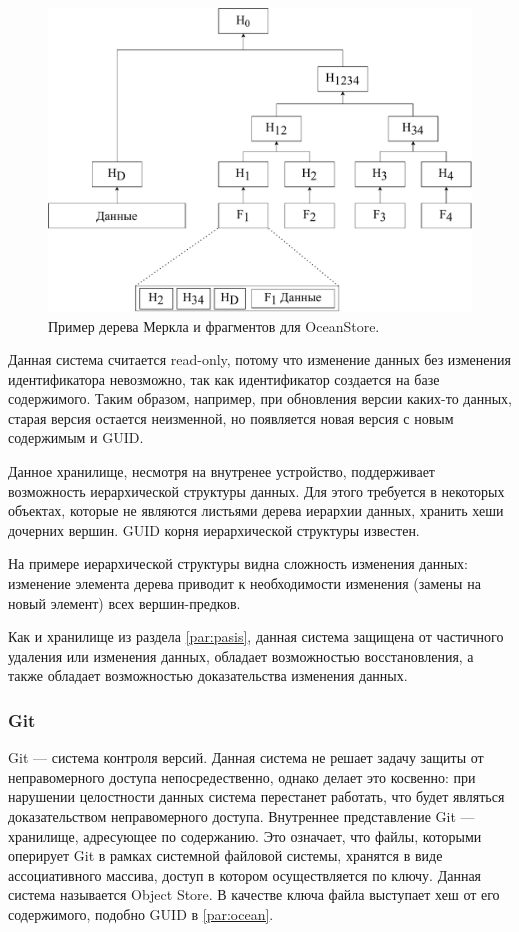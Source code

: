 \begin{figure}[hbtp]
	\centering
	\includegraphics[width=\textwidth]{img/ocean.pdf}
	\caption{Пример дерева Меркла и фрагментов для OceanStore.}
	\label{fig:ocean}
\end{figure}

Данная система считается read-only, потому что изменение данных без изменения идентификатора невозможно, так как идентификатор создается на базе содержимого. Таким образом, например, при обновления версии каких-то данных, старая версия остается неизменной, но появляется новая версия с новым содержимым и GUID.

Данное хранилище, несмотря на внутренее устройство, поддерживает возможность иерархической структуры данных. Для этого требуется в некоторых объектах, которые не являются листьями дерева иерархии данных, хранить хеши дочерних вершин. GUID корня иерархической структуры известен.

На примере иерархической структуры видна сложность изменения данных: изменение элемента дерева приводит к необходимости изменения (замены на новый элемент) всех вершин-предков.

Как и хранилище из раздела \ref{par:pasis}, данная система защищена от частичного удаления или изменения данных, обладает возможностью восстановления, а также обладает возможностью доказательства изменения данных.

\subsubsection{Git}

Git \cite{git} --- система контроля версий. Данная система не решает задачу защиты от неправомерного доступа непосредественно, однако делает это косвенно: при нарушении целостности данных система перестанет работать, что будет являться доказательством неправомерного доступа. Внутреннее представление Git --- хранилище, адресующее по содержанию. Это означает, что файлы, которыми оперирует Git в рамках системной файловой системы, хранятся в виде ассоциативного массива, доступ в котором осуществляется по ключу. Данная система называется Object Store. В качестве ключа файла выступает хеш от его содержимого, подобно GUID в \ref{par:ocean}.

